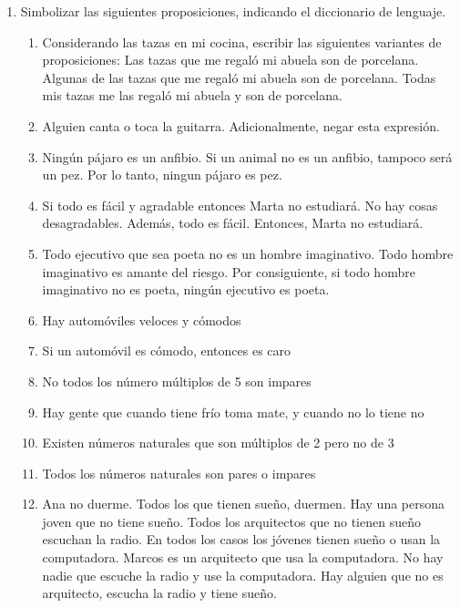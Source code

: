\documentclass[a4paper]{article}
\newcommand{\exercise}{\item}
\begin{document}
\begin{enumerate}
\begin{enumerate} [label=(\alph*)]
		\item Si $n^2$ es un número entero par, entonces $n$ es par.
		\item Dados dos números racionales, $r$ y $s$. La suma de $r$ y $s$ es un número racional. Tambien se podría leer como: La suma de dos números racionales es racional. 
		\item El producto de dos números números racionales es racional. 
	\end{enumerate}
	\exercise Simbolizar las siguientes proposiciones, indicando el diccionario de lenguaje.
	\begin{enumerate} [label=(\alph*)]
		\item Considerando las tazas en mi cocina, escribir las siguientes variantes de proposiciones: Las tazas que me regaló mi abuela son de porcelana. Algunas de las tazas que me regaló mi abuela son de porcelana. Todas mis tazas me las regaló mi abuela y son de porcelana.
		\item Alguien canta o toca la guitarra. Adicionalmente, negar esta expresión. 
		\item Ningún pájaro es un anfibio. Si un animal no es un anfibio, tampoco será un pez. Por lo tanto, ningun pájaro es pez.
		\item Si todo es fácil y agradable entonces Marta no estudiará. No hay cosas desagradables. Además, todo es fácil. Entonces, Marta no estudiará.
		\item Todo ejecutivo que sea poeta no es un hombre imaginativo. Todo hombre imaginativo es amante del riesgo. Por consiguiente, si todo hombre imaginativo no es poeta, ningún ejecutivo es poeta.
		\item Hay automóviles veloces y cómodos
		\item Si un automóvil es cómodo, entonces es caro
		\item No todos los número múltiplos de 5 son impares
		\item Hay gente que cuando tiene frío toma mate, y cuando no lo tiene no
		\item Existen números naturales que son múltiplos de 2 pero no de 3
		\item Todos los números naturales son pares o impares
		\item Ana no duerme. Todos los que tienen sueño, duermen. Hay una persona joven que no tiene sueño. Todos los 	arquitectos que no tienen sueño escuchan la radio. En todos los casos los jóvenes tienen sueño o usan la computadora. Marcos es un arquitecto que usa la computadora. No hay nadie que escuche la radio y use la computadora. Hay alguien que no es arquitecto, escucha la radio y tiene sueño.

\end{enumerate}
\end{enumerate}
\end{document}
